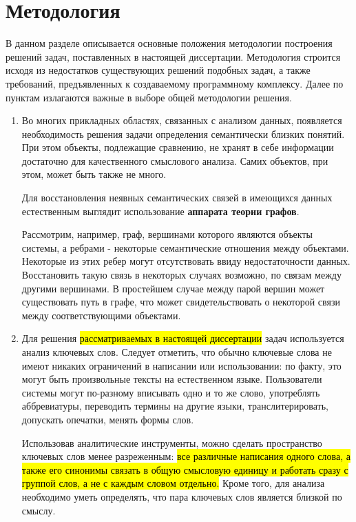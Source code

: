 \section{Методология} \label{methodology}
В данном разделе описывается основные положения методологии построения решений задач, поставленных в настоящей диссертации. Методология строится исходя из недостатков существующих решений подобных задач, а также требований, предъявленных к создаваемому программному комплексу.
Далее по пунктам излагаются важные в выборе общей методологии решения.

\begin{enumerate}
    \item Во многих прикладных областях, связанных с анализом данных, появляется необходимость решения задачи определения семантически близких понятий. При этом объекты, подлежащие сравнению, не хранят в себе информации достаточно для качественного смыслового анализа. Самих объектов, при этом, может быть также не много.

        Для восстановления неявных семантических связей в имеющихся данных естественным выглядит использование \textbf{аппарата теории графов}.
    
        Рассмотрим, например, граф, вершинами которого являются объекты системы, а ребрами - некоторые семантические отношения между объектами. Некоторые из этих ребер могут отсутствовать ввиду недостаточности данных. Восстановить такую связь в некоторых случаях возможно, по связам между другими вершинами. В простейшем случае между парой вершин может существовать путь в графе, что может свидетельствовать о некоторой связи между соответствующими объектами.
    \item Для решения \hl{рассматриваемых в настоящей диссертации} задач используется анализ ключевых слов. Следует отметить, что обычно ключевые слова не имеют никаких ограничений в написании или использовании: по факту, это могут быть произвольные тексты на естественном языке. Пользователи системы могут по-разному вписывать одно и то же слово, употреблять аббревиатуры, переводить термины на другие языки, транслитерировать, допускать опечатки, менять формы слов.

        Использовав аналитические инструменты, можно сделать пространство ключевых слов менее разреженным: \hl{все различные написания одного слова, а также его синонимы связать в общую смысловую единицу и работать сразу с группой слов, а не с каждым словом отдельно.} Кроме того, для анализа необходимо уметь определять, что пара ключевых слов является близкой по смыслу.


\end{enumerate}
